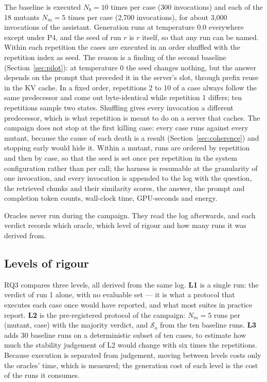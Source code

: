 \documentclass[a4paper,fleqn]{cas-dc}
\newcommand{\Sset}{\mathcal{S}}
\begin{document}
The baseline is executed $N_b = 10$ times per case (300 invocations) and each
of the 18 mutants $N_m = 5$ times per case (2,700 invocations), for about
3,000 invocations of the assistant. Generation runs at temperature 0.0
everywhere except under P4, and the seed of run $r$ is $r$ itself, so that any
run can be named. Within each repetition the cases are executed in an order
shuffled with the repetition index as seed. The reason is a finding of the
second baseline (Section~\ref{sec:pilot}): at temperature 0 the seed changes
nothing, but the answer depends on the prompt that preceded it in the
server's slot, through prefix reuse in the KV cache. In a fixed order,
repetitions 2 to 10 of a case always follow the same predecessor and come
out byte-identical while repetition 1 differs; ten repetitions sample two
states. Shuffling gives every invocation a different predecessor, which is
what repetition is meant to do on a server that caches. The campaign does not stop at the first killing case: every
case runs against every mutant, because the cause of each death is a result
(Section~\ref{sec:coherence}) and stopping early would hide it. Within a
mutant, runs are ordered by repetition and then by case, so that the seed is
set once per repetition in the system configuration rather than per call; the
harness is resumable at the granularity of one invocation, and every invocation is appended to the log with the question,
the retrieved chunks and their similarity scores, the answer, the prompt and
completion token counts, wall-clock time, GPU-seconds and energy.

Oracles never run during the campaign. They read the log afterwards, and each
verdict records which oracle, which level of rigour and how many runs it was
derived from.

\subsection{Levels of rigour}
\label{sec:levels}

RQ3 compares three levels, all derived from the same log. \textbf{L1} is a
single run: the verdict of run 1 alone, with no evaluable set --- it is what a
protocol that executes each case once would have reported, and what most
suites in practice report. \textbf{L2} is the pre-registered protocol of the
campaign: $N_m = 5$ runs per (mutant, case) with the majority verdict, and
$\Sset_o$ from the ten baseline runs. \textbf{L3} adds 30 baseline runs on a
deterministic subset of ten cases, to estimate how much the stability
judgement of L2 would change with six times the repetitions. Because
execution is separated from judgement, moving between levels costs only the
oracles' time, which is measured; the generation cost of each level is the
cost of the runs it consumes.
\end{document}
